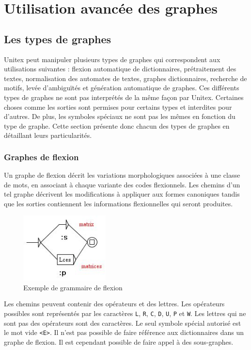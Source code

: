 \chapter{Utilisation avancée des graphes}
\label{chap-advanced-grammars}
\section{Les types de graphes}
Unitex peut manipuler plusieurs types de graphes qui correspondent aux utilisations
suivantes : flexion automatique de dictionnaires, prétraitement des textes, normalisation
des automates de textes, graphes dictionnaires, recherche de motifs, levée d’ambiguïtés et
génération automatique de graphes. Ces différents types de graphes ne sont pas interprétés
de la même façon par Unitex. Certaines choses comme les sorties sont permises pour certains
types et interdites pour d’autres. De plus, les symboles spéciaux ne sont pas les mêmes en
fonction du type de graphe. Cette section présente donc chacun des types de graphes en
détaillant leurs particularités.


\subsection{Graphes de flexion}
Un graphe de flexion décrit les variations morphologiques associées à une classe de
mots, en associant à chaque variante des codes flexionnels. Les chemins d’un tel graphe décrivent
les modifications à appliquer aux formes canoniques tandis que les sorties contiennent
les informations flexionnelles qui seront produites.


\bigskip
\begin{figure}[!h]
\begin{center}
\includegraphics[width=4.5cm]{resources/img/fig6-1.png}
\caption{Exemple de grammaire de flexion}
\end{center}
\end{figure}

\noindent Les chemins peuvent contenir des opérateurs et des lettres. Les opérateurs possibles
sont représentés par les caractères \verb+L+, \verb+R+, \verb+C+, \verb+D+, \verb+U+, \verb+P+ et
\verb+W+.
Les lettres qui ne sont pas des opérateurs sont des caractères. Le seul symbole spécial autorisé est
le mot vide \verb+<E>+. Il n’est pas possible de faire référence aux dictionnaires
dans un graphe de flexion. Il est cependant possible de
faire appel à des sous-graphes.

